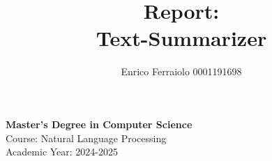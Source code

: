 \documentclass[a4paper, 12pt]{article}
\title{\textbf{Report: \\ Text-Summarizer}}
\author{Enrico Ferraiolo 0001191698}
\date{}
\begin{document}
\maketitle

\begin{center}
    \textbf{Master's Degree in Computer Science}\\
    \vspace{0.3cm}
    Course: Natural Language Processing \\
    Academic Year: 2024-2025
    \vspace{2cm}
\end{center}

\newpage

\tableofcontents
\newpage










\newpage
\printbibliography
\end{document}
